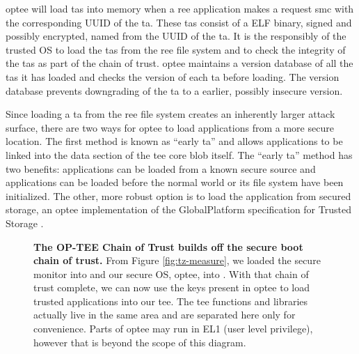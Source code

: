 \gls{optee} will load \glspl{ta} into memory when a \gls{ree} application makes a request \gls{smc} with the corresponding UUID of the \gls{ta}. These \glspl{ta} consist of a ELF binary, signed and possibly encrypted, named from the UUID of the \gls{ta}. It is the responsibly of the trusted OS to load the \glspl{ta} from the \gls{ree} file system and to check the integrity of the \glspl{ta} as part of the \gls{chain of trust}. \gls{optee} maintains a version database of all the \glspl{ta} it has loaded and checks the version of each \gls{ta} before loading. The version database prevents downgrading of the \gls{ta} to a earlier, possibly insecure version.

Since loading a \gls{ta} from the \gls{ree} file system creates an inherently larger attack surface, there are two ways for \gls{optee} to load applications from a more secure location. The first method is known as ``early \gls{ta}'' and allows applications to be linked into the data section of the \gls{tee} core blob itself. The ``early \gls{ta}'' method has two benefits: applications can be loaded from a known secure source and applications can be loaded before the normal world or its file system have been initialized. The other, more robust option is to load the application from secured storage, an \gls{optee} implementation of the GlobalPlatform specification for Trusted Storage \cite{GlobalPlatform2018}. 

\begin{figure}[ht]
\makebox[\textwidth][c]{
}\caption[OP-TEE Chain of Trust]{\textbf{The OP-TEE Chain of Trust builds off the secure boot chain of trust.} From Figure \ref{fig:tz-measure}, we loaded the secure monitor into \blto and our secure OS, \gls{optee}, into \blttw. With that \gls{chain of trust} complete, we can now use the keys present in \gls{optee} to load trusted applications into our \gls{tee}. The \gls{tee} functions and libraries actually live in the same area and are separated here only for convenience. Parts of \gls{optee} may run in EL1 (user level privilege), however that is beyond the scope of this diagram.
\label{fig:tz-attest}}
\end{figure}

